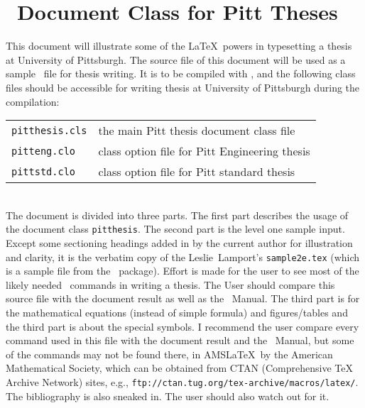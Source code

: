 
\part{\LaTeXe\ Document Class for Pitt Theses}

This document will illustrate some of the \LaTeX\ powers in typesetting
a thesis at University of Pittsburgh. The source file of this document
will be used as a sample \LaTeXe\ file for thesis writing.
It is to be compiled with \LaTeXe, and the following class files should be
accessible for writing thesis at University of Pittsburgh during the
compilation: \\

\begin{tabular}{ll}
\texttt{pitthesis.cls} & the main Pitt thesis document class file \\
\texttt{pitteng.clo}   & class option file for Pitt Engineering thesis \\
\texttt{pittstd.clo}   & class option file for Pitt standard thesis \\
\end{tabular} \\

The document is divided into three parts. The first part describes the usage of
the document class \texttt{pitthesis}.	The second part is the level one sample
input.	Except some sectioning headings added in by the current author for
illustration and clarity, it is the verbatim copy of the Leslie~Lamport's
\texttt{sample2e.tex} (which is a sample file from the \LaTeXe\ package).
Effort is made for the user to see most of the likely needed \LaTeXe\ commands
in writing a thesis.  The User should compare this source file with the
document result as well as the \LaTeXe\ Manual.\cite{lp:latex}
The third part is for the mathematical equations (instead of simple formula)
and figures/tables and the third part is about the special symbols.
I recommend the user compare every command used in this file with the document
result and the \LaTeXe\ Manual, but some of the commands may not be found there,
in AMS\LaTeX\ by the American Mathematical Society, which can be obtained from
CTAN (Comprehensive TeX Archive Network) sites, e.g.,
\verb|ftp://ctan.tug.org/tex-archive/macros/latex/|.
The bibliography is also sneaked in. The user should also watch out for it.

